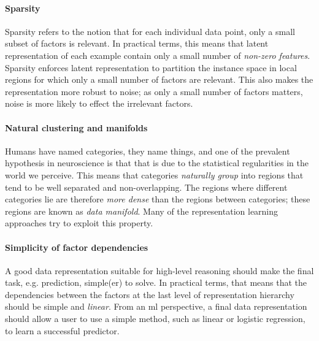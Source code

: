 \paragraph{\textbf{Sparsity}}
Sparsity refers to the notion that for each individual data point, only a small subset of factors is relevant.
In practical terms, this means that latent representation of each example contain only a small number of \textit{non-zero features}.
Sparsity enforces latent representation to partition the instance space in local regions for which only a small number of factors are relevant.
This also makes the representation more robust to noise; as only a small number of factors matters, noise is more likely to effect the irrelevant factors.




\paragraph{\textbf{Natural clustering and manifolds}}
Humans have named categories, they name things, and one of the prevalent hypothesis in neuroscience is that that is due to the statistical regularities in the world we perceive.
This means that categories \textit{naturally group} into regions that tend to be well separated and non-overlapping.
The regions where different categories lie are therefore \textit{more dense} than the regions between categories; these regions are known as \textit{data manifold}.
Many of the representation learning approaches try to exploit this property.

 



\paragraph{\textbf{Simplicity of factor dependencies}}
A good data representation suitable for high-level reasoning should make the final task, e.g. prediction, simple(er) to solve.
In practical terms, that means that the dependencies between the factors at the last level of representation hierarchy should be simple and \textit{linear}.
From an \gls{ml} perspective, a final data representation should allow a user to use a simple method, such as linear or logistic regression, to learn a successful predictor.












